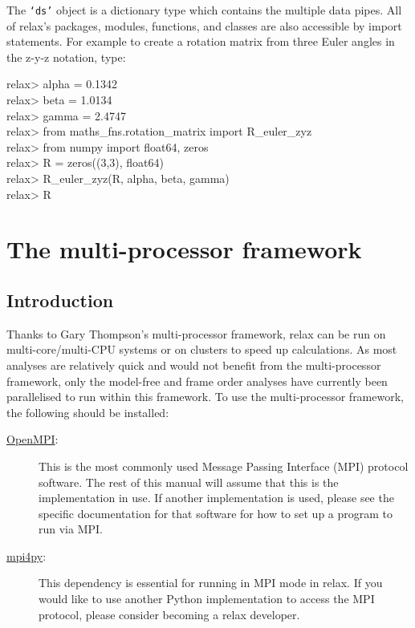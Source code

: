 
The \texttt{`ds'} object is a dictionary type which contains the multiple data pipes.  All of relax's packages, modules, functions, and classes are also accessible by import statements.  For example to create a rotation matrix from three Euler angles in the z-y-z notation, type:

\begin{exampleenv}
relax> alpha = 0.1342 \\
relax> beta = 1.0134 \\
relax> gamma = 2.4747 \\
relax> from maths\_fns.rotation\_matrix import R\_euler\_zyz \\
relax> from numpy import float64, zeros \\
relax> R = zeros((3,3), float64) \\
relax> R\_euler\_zyz(R, alpha, beta, gamma) \\
relax> R
\end{exampleenv}




\section{The multi-processor framework}




\subsection{Introduction}

Thanks to Gary Thompson's multi-processor framework, relax can be run on multi-core/multi-CPU systems or on clusters to speed up calculations.  As most analyses are relatively quick and would not benefit from the multi-processor framework, only the model-free and frame order analyses have currently been parallelised to run within this framework.  To use the multi-processor framework, the following should be installed:

\begin{description}
\item[\href{http://www.open-mpi.org/}{OpenMPI}:]  This is the most commonly used Message Passing Interface (MPI) protocol software.  The rest of this manual will assume that this is the implementation in use.  If another implementation is used, please see the specific documentation for that software for how to set up a program to run via MPI.
\item[\href{http://mpi4py.scipy.org/}{mpi4py}:]  This dependency is essential for running in MPI mode in relax.  If you would like to use another Python implementation to access the MPI protocol, please consider becoming a relax developer.
\end{description}



